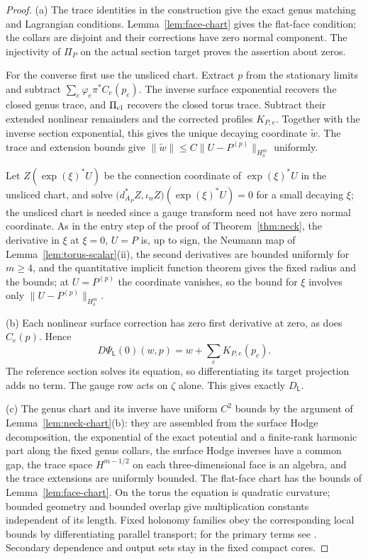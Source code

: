 \documentclass[11pt]{amsart}
\theoremstyle{definition}
\theoremstyle{remark}
\theoremstyle{plain}
\numberwithin{equation}{section}
\begin{document}
\begin{proof}
(a) The trace identities in the construction give the exact genus
matching and Lagrangian conditions. Lemma~\ref{lem:face-chart}
gives the flat-face condition; the collars are disjoint and their
corrections have zero normal component. The injectivity of $\Pi_P$
on the actual section target proves the assertion about zeros.

For the converse first use the unsliced chart. Extract $p$ from the
stationary limits and subtract $\sum_e\varphi_e\pi^*C_e(p_e)$.
The inverse surface exponential recovers the closed genus trace,
and $\Pi_{\rm cl}$ recovers the closed torus trace. Subtract their
extended nonlinear remainders and the corrected profiles $K_{P,e}$.
Together with the inverse section exponential, this gives the
unique decaying coordinate $\widetilde w$. The trace and extension
bounds give
$\|\widetilde w\|\le C\|U-P^{(p)}\|_{H^m_\delta}$ uniformly.

Let $Z(\exp(\xi)^*U)$ be the connection coordinate of $\exp(\xi)^*U$ in the unsliced chart, and
solve $\bigl(d_{A_P}^*Z,\iota_nZ\bigr)(\exp(\xi)^*U)=0$ for a small decaying $\xi$; the unsliced
chart is needed since a gauge transform need not have zero normal coordinate. As in the entry
step of the proof of Theorem~\ref{thm:neck}, the derivative in $\xi$ at $\xi=0$, $U=P$ is, up to
sign, the Neumann map of Lemma~\ref{lem:torus-scalar}(ii), the second derivatives are bounded
uniformly for $m\ge4$, and the quantitative implicit function theorem gives the fixed radius and
the bounds; at $U=P^{(p)}$ the coordinate vanishes, so the bound for $\xi$ involves only
$\|U-P^{(p)}\|_{H^m_\delta}$.

(b) Each nonlinear surface correction has zero first derivative
at zero, as does $C_e(p)$. Hence
\[
 D\Psi_\mathsf L(0)(w,p)=w+\sum_e K_{P,e}(p_e).
\]
The reference section solves its equation, so differentiating its
target projection adds no term. The gauge row acts on $\zeta$
alone. This gives exactly $D_\mathsf L$.

(c) The genus chart and its inverse have uniform $C^2$ bounds by the argument of
Lemma~\ref{lem:neck-chart}(b): they are assembled from the surface Hodge decomposition, the
exponential of the exact potential and a finite-rank harmonic part along the fixed genus
collars, the surface Hodge inverses have a common gap, the trace space $H^{m-1/2}$ on each
three-dimensional face is an algebra, and the trace extensions are uniformly bounded. The
flat-face chart has the bounds of Lemma~\ref{lem:face-chart}.
On the torus the equation is quadratic curvature; bounded geometry
and bounded overlap give multiplication constants independent of
its length. Fixed holonomy families obey the corresponding local
bounds by differentiating parallel transport; for the primary
terms see \cite[Proposition~6.1]{DFL}. Secondary dependence and
output sets stay in the fixed compact cores.


\end{proof}
\end{document}
